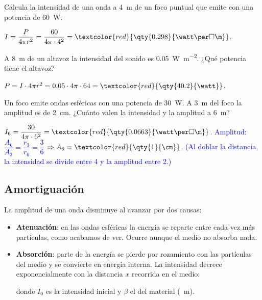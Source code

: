 \begin{exercise}
    Calcula la intensidad de una onda a \qty{4}{\m} de un foco puntual que emite con una potencia de \qty{60}{\watt}.
    \begin{solu}
        \(I = \dfrac{P}{4\pi r^2} = \dfrac{60}{4\pi\cdot 4^2} = \textcolor{red}{\qty{0.298}{\watt\per\square\m}}\).
    \end{solu}
\end{exercise}

\begin{exercise}
    A \qty{8}{\m} de un altavoz la intensidad del sonido es \qty{0.05}{\watt\per\square\m}. ¿Qué potencia tiene el altavoz?
    \begin{solu}
        \(P = I\cdot 4\pi r^2 = 0{,}05\cdot 4\pi\cdot 64 = \textcolor{red}{\qty{40.2}{\watt}}\).
    \end{solu}
\end{exercise}

\begin{exercise}
    Un foco emite ondas esféricas con una potencia de \qty{30}{\watt}. A \qty{3}{\m} del foco la amplitud es de \qty{2}{\cm}.
    ¿Cuánto valen la intensidad y la amplitud a \qty{6}{\m}?
    \begin{solu}
        \(I_6 = \dfrac{30}{4\pi\cdot 6^2} = \textcolor{red}{\qty{0.0663}{\watt\per\square\m}}\).
        \textcolor{blue}{Amplitud: \(\dfrac{A_6}{A_3} = \dfrac{r_3}{r_6} = \dfrac{3}{6}\)} \(\Rightarrow A_6 = \textcolor{red}{\qty{1}{\cm}}\).
        \textcolor{blue}{(Al doblar la distancia, la intensidad se divide entre 4 y la amplitud entre 2.)}
    \end{solu}
\end{exercise}

\subsection{Amortiguación}\label{subsec:ond-amortiguacion}

La amplitud de una onda disminuye al avanzar por dos causas:
\begin{itemize}
    \item \textbf{Atenuación}: en las ondas esféricas la energía se reparte entre cada vez más partículas, como acabamos de
    ver. Ocurre aunque el medio no absorba nada.
    \item \textbf{Absorción}: parte de la energía se pierde por rozamiento con las partículas del medio y se convierte en
    energía interna. La intensidad decrece exponencialmente con la distancia \(x\) recorrida en el medio:
    \begin{centeredequation}
         \label{eq:ond-absorcion}
    \end{centeredequation}
    donde \(I_0\) es la intensidad inicial y \(\beta\) el  del material (\unit{\per\m}).
\end{itemize}

